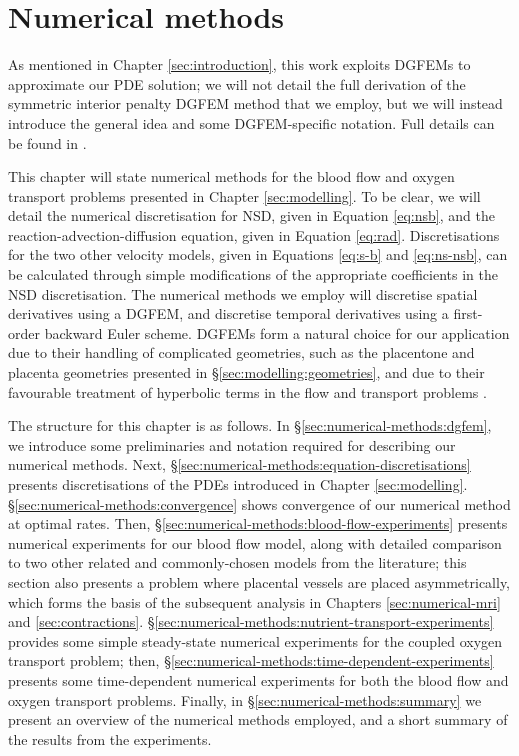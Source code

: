 \chapter{Numerical methods} \label{sec:numerical-methods}   

    As mentioned in Chapter \ref{sec:introduction}, this work exploits DGFEMs to approximate our PDE solution; we will not detail the full derivation of the symmetric interior penalty DGFEM method that we employ, but we will instead introduce the general idea and some DGFEM-specific notation. Full details can be found in \cite{arnoldUnifiedAnalysisDiscontinuous2006,cangianiHpVersionDiscontinuousGalerkin2017}.

    This chapter will state numerical methods for the blood flow and oxygen transport problems presented in Chapter \ref{sec:modelling}. To be clear, we will detail the numerical discretisation for NSD, given in Equation \eqref{eq:nsb}, and the reaction-advection-diffusion equation, given in Equation \eqref{eq:rad}. Discretisations for the two other velocity models, given in Equations \eqref{eq:s-b} and \eqref{eq:ns-nsb}, can be calculated through simple modifications of the appropriate coefficients in the NSD discretisation. The numerical methods we employ will discretise spatial derivatives using a DGFEM, and discretise temporal derivatives using a first-order backward Euler scheme. DGFEMs form a natural choice for our application due to their handling of complicated geometries, such as the placentone and placenta geometries presented in \S\ref{sec:modelling:geometries}, and due to their favourable treatment of hyperbolic terms in the flow and transport problems \cite{cangianiHpVersionDiscontinuousGalerkin2017}.
    
    The structure for this chapter is as follows. In \S\ref{sec:numerical-methods:dgfem}, we introduce some preliminaries and notation required for describing our numerical methods. Next, \S\ref{sec:numerical-methods:equation-discretisations} presents discretisations of the PDEs introduced in Chapter \ref{sec:modelling}. \S\ref{sec:numerical-methods:convergence} shows convergence of our numerical method at optimal rates. Then, \S\ref{sec:numerical-methods:blood-flow-experiments} presents numerical experiments for our blood flow model, along with detailed comparison to two other related and commonly-chosen models from the literature; this section also presents a problem where placental vessels are placed asymmetrically, which forms the basis of the subsequent analysis in Chapters \ref{sec:numerical-mri} and \ref{sec:contractions}. \S\ref{sec:numerical-methods:nutrient-transport-experiments} provides some simple steady-state numerical experiments for the coupled oxygen transport problem; then, \S\ref{sec:numerical-methods:time-dependent-experiments} presents some time-dependent numerical experiments for both the blood flow and oxygen transport problems. Finally, in \S\ref{sec:numerical-methods:summary} we present an overview of the numerical methods employed, and a short summary of the results from the experiments.

